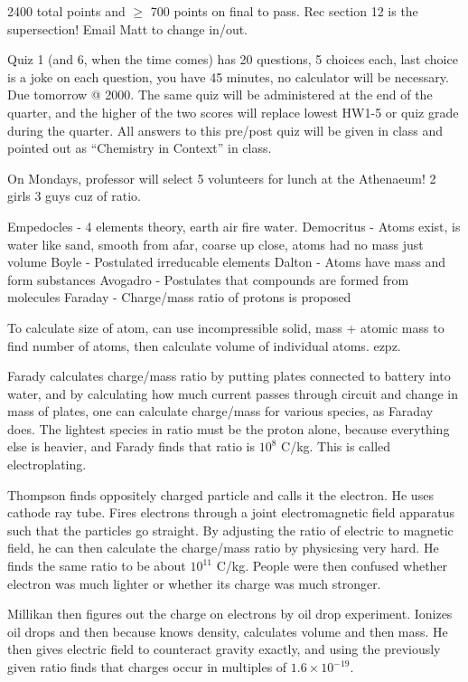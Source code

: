 \documentclass{report}
\begin{document}
2400 total points and $\geq$ 700 points on final to pass. Rec section 12 is the supersection! Email Matt to change in/out.

Quiz 1 (and 6, when the time comes) has 20 questions, 5 choices each, last choice is a joke on each question, you have 45 minutes, no calculator will be necessary. Due tomorrow @ 2000. The same quiz will be administered at the end of the quarter, and the higher of the two scores will replace lowest HW1-5 or quiz grade during the quarter. All answers to this pre/post quiz will be given in class and pointed out as "`Chemistry in Context"' in class. 

On Mondays, professor will select 5 volunteers for lunch at the Athenaeum! 2 girls 3 guys cuz of ratio.

Empedocles - 4 elements theory, earth air fire water.
Democritus - Atoms exist, is water like sand, smooth from afar, coarse up close, atoms had no mass just volume
Boyle - Postulated irreducable elements
Dalton - Atoms have mass and form substances
Avogadro - Postulates that compounds are formed from molecules
Faraday - Charge/mass ratio of protons is proposed

To calculate size of atom, can use incompressible solid, mass + atomic mass to find number of atoms, then calculate volume of individual atoms. ezpz.

Farady calculates charge/mass ratio by putting plates connected to battery into water, and by calculating how much current passes through circuit and change in mass of plates, one can calculate charge/mass for various species, as Faraday does. The lightest species in ratio must be the proton alone, because everything else is heavier, and Farady finds that ratio is $10^8$ C/kg. This is called electroplating. 

Thompson finds oppositely charged particle and calls it the electron. He uses cathode ray tube. Fires electrons through a joint electromagnetic field apparatus such that the particles go straight. By adjusting the ratio of electric to magnetic field, he can then calculate the charge/mass ratio by physicsing very hard. He finds the same ratio to be about $10^11$ C/kg. People were then confused whether electron was much lighter or whether its charge was much stronger. 

Millikan then figures out the charge on electrons by oil drop experiment. Ionizes oil drops and then because knows density, calculates volume and then mass. He then gives electric field to counteract gravity exactly, and using the previously given ratio finds that charges occur in multiples of $1.6 \times 10^{-19}$. 
\end{document}
